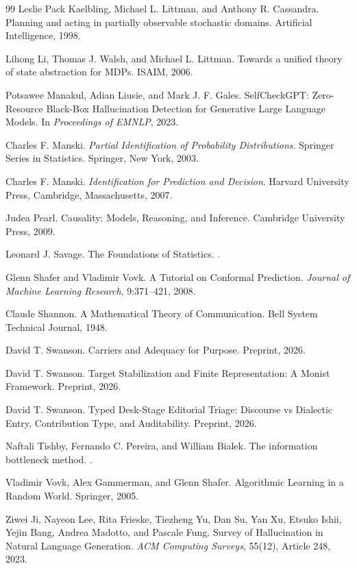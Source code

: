 \documentclass[11pt]{article}
\begin{document}
\begin{thebibliography}{99}
Leslie Pack Kaelbling, Michael L. Littman, and Anthony R. Cassandra.
\newblock Planning and acting in partially observable stochastic domains.
\newblock Artificial Intelligence, 1998.

Lihong Li, Thomas J. Walsh, and Michael L. Littman.
\newblock Towards a unified theory of state abstraction for MDPs.
\newblock ISAIM, 2006.

Potsawee Manakul, Adian Liusie, and Mark J. F. Gales.
\newblock SelfCheckGPT: Zero-Resource Black-Box Hallucination Detection for Generative Large Language Models.
\newblock In \emph{Proceedings of EMNLP}, 2023.

Charles F. Manski.
\newblock \emph{Partial Identification of Probability Distributions}.
\newblock Springer Series in Statistics. Springer, New York, 2003.

Charles F. Manski.
\newblock \emph{Identification for Prediction and Decision}.
\newblock Harvard University Press, Cambridge, Massachusetts, 2007.

Judea Pearl.
\newblock Causality: Models, Reasoning, and Inference.
\newblock Cambridge University Press, 2009.

Leonard J. Savage.
\newblock The Foundations of Statistics.
.

Glenn Shafer and Vladimir Vovk.
\newblock A Tutorial on Conformal Prediction.
\newblock \emph{Journal of Machine Learning Research}, 9:371--421, 2008.

Claude Shannon.
\newblock A Mathematical Theory of Communication.
\newblock Bell System Technical Journal, 1948.

David T. Swanson.
\newblock Carriers and Adequacy for Purpose.
\newblock Preprint, 2026.

David T. Swanson.
\newblock Target Stabilization and Finite Representation: A Monist Framework.
\newblock Preprint, 2026.

David T. Swanson.
\newblock Typed Desk-Stage Editorial Triage: Discourse vs Dialectic Entry, Contribution Type, and Auditability.
\newblock Preprint, 2026.

Naftali Tishby, Fernando C. Pereira, and William Bialek.
\newblock The information bottleneck method.
.

Vladimir Vovk, Alex Gammerman, and Glenn Shafer.
\newblock Algorithmic Learning in a Random World.
\newblock Springer, 2005.

Ziwei Ji, Nayeon Lee, Rita Frieske, Tiezheng Yu, Dan Su, Yan Xu, Etsuko Ishii, Yejin Bang, Andrea Madotto, and Pascale Fung.
\newblock Survey of Hallucination in Natural Language Generation.
\newblock \emph{ACM Computing Surveys}, 55(12), Article 248, 2023.

\end{thebibliography}
\end{document}
